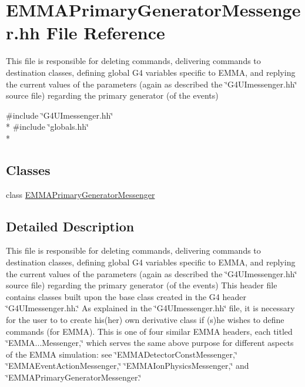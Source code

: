\hypertarget{EMMAPrimaryGeneratorMessenger_8hh}{\section{E\-M\-M\-A\-Primary\-Generator\-Messenger.\-hh File Reference}
\label{EMMAPrimaryGeneratorMessenger_8hh}
}


This file is responsible for deleting commands, delivering commands to destination classes, defining global G4 variables specific to E\-M\-M\-A, and replying the current values of the parameters (again as described the \char`\"{}\-G4\-U\-Imessenger.\-hh\char`\"{} source file) regarding the primary generator (of the events)  


{\ttfamily \#include \char`\"{}G4\-U\-Imessenger.\-hh\char`\"{}}\\*
{\ttfamily \#include \char`\"{}globals.\-hh\char`\"{}}\\*
\subsection*{Classes}
\begin{DoxyCompactItemize}
\item 
class \hyperlink{classEMMAPrimaryGeneratorMessenger}{E\-M\-M\-A\-Primary\-Generator\-Messenger}
\end{DoxyCompactItemize}


\subsection{Detailed Description}
This file is responsible for deleting commands, delivering commands to destination classes, defining global G4 variables specific to E\-M\-M\-A, and replying the current values of the parameters (again as described the \char`\"{}\-G4\-U\-Imessenger.\-hh\char`\"{} source file) regarding the primary generator (of the events) This header file contains classes built upon the base class created in the G4 header \char`\"{}\-G4\-U\-Imessenger.\-hh.\char`\"{} As explained in the \char`\"{}\-G4\-U\-Imessenger.\-hh\char`\"{} file, it is necessary for the user to to create his(her) own derivative class if (s)he wishes to define commands (for E\-M\-M\-A). This is one of four similar E\-M\-M\-A headers, each titled \char`\"{}\-E\-M\-M\-A...\-Messenger,\char`\"{} which serves the same above purpose for different aspects of the E\-M\-M\-A simulation\-: see \char`\"{}\-E\-M\-M\-A\-Detector\-Const\-Messenger,\char`\"{} \char`\"{}\-E\-M\-M\-A\-Event\-Action\-Messenger,\char`\"{} \char`\"{}\-E\-M\-M\-A\-Ion\-Physics\-Messenger,\char`\"{} and \char`\"{}\-E\-M\-M\-A\-Primary\-Generator\-Messenger.\char`\"{} 